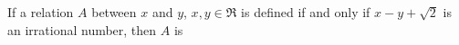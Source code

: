

\question[2] If a relation $A$ between $x$ and $y$, $x,y \in\Re$ is defined if and only if 
$x-y+\sqrt{2}$ is an irrational number, then $A$ is 


\ifprintanswers
\fi 

\begin{checkboxes}
\end{checkboxes}
